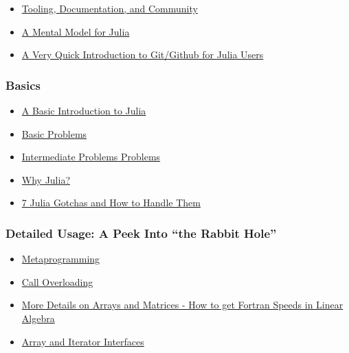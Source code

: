 \documentclass[11pt]{article}
\begin{document}
\begin{itemize}
\itemsep1pt\parskip0pt
\item
  \href{http://ucidatascienceinitiative.github.io/IntroToJulia/Html/ToolingDocumentationCommunity}{Tooling,
  Documentation, and Community}
\item
  \href{http://ucidatascienceinitiative.github.io/IntroToJulia/Html/JuliaMentalModel}{A
  Mental Model for Julia}
\item
  \href{http://ucidatascienceinitiative.github.io/IntroToJulia/Html/GithubIntroduction}{A
  Very Quick Introduction to Git/Github for Julia Users}
\end{itemize}

\subsubsection{Basics}\label{basics}

\begin{itemize}
\itemsep1pt\parskip0pt
\item
  \href{http://ucidatascienceinitiative.github.io/IntroToJulia/Html/BasicIntroduction}{A
  Basic Introduction to Julia}
\item
  \href{http://ucidatascienceinitiative.github.io/IntroToJulia/Html/BasicProblems}{Basic
  Problems}
\item
  \href{http://ucidatascienceinitiative.github.io/IntroToJulia/Html/BasicProblems}{Intermediate
  Problems Problems}
\item
  \href{http://ucidatascienceinitiative.github.io/IntroToJulia/Html/WhyJulia}{Why
  Julia?}
\item
  \href{http://www.stochasticlifestyle.com/7-julia-gotchas-handle/}{7
  Julia Gotchas and How to Handle Them}
\end{itemize}

\subsubsection{Detailed Usage: A Peek Into ``the Rabbit
Hole''}\label{detailed-usage-a-peek-into-the-rabbit-hole}

\begin{itemize}
\itemsep1pt\parskip0pt
\item
  \href{http://ucidatascienceinitiative.github.io/IntroToJulia/Html/Metaprogramming}{Metaprogramming}
\item
  \href{http://ucidatascienceinitiative.github.io/IntroToJulia/Html/CallOverloading}{Call
  Overloading}
\item
  \href{http://ucidatascienceinitiative.github.io/IntroToJulia/Html/ArraysAndMatrices}{More
  Details on Arrays and Matrices - How to get Fortran Speeds in Linear
  Algebra}
\item
  \href{http://ucidatascienceinitiative.github.io/IntroToJulia/Html/ArrayIteratorInterfaces}{Array
  and Iterator Interfaces}
\end{itemize}
\end{document}

